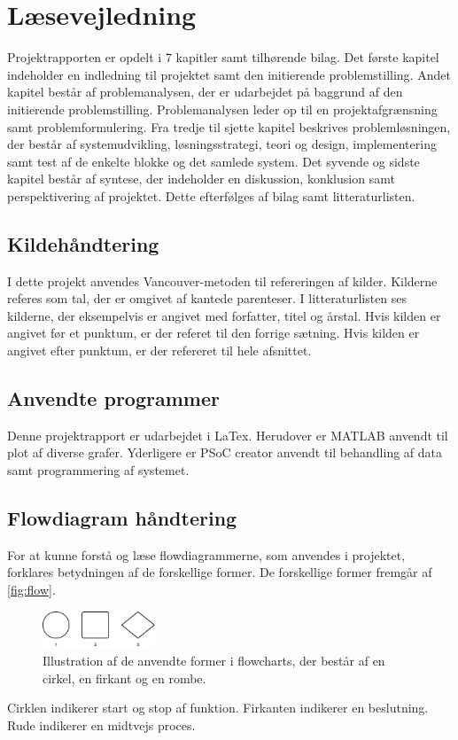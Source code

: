 \section*{Læsevejledning}
Projektrapporten er opdelt i 7 kapitler samt tilhørende bilag. Det første kapitel indeholder en indledning til projektet samt den initierende problemstilling. Andet kapitel består af problemanalysen, der er udarbejdet på baggrund af den initierende problemstilling. Problemanalysen leder op til en projektafgrænsning samt problemformulering. Fra tredje til sjette kapitel beskrives problemløsningen, der består af systemudvikling, løsningsstrategi, teori og design, implementering samt test af de enkelte blokke og det samlede system. Det syvende og sidste kapitel består af syntese, der indeholder en diskussion, konklusion samt perspektivering af projektet. Dette efterfølges af bilag samt litteraturlisten. 


\subsection*{Kildehåndtering}
I dette projekt anvendes Vancouver-metoden til refereringen af kilder. Kilderne referes som tal, der er omgivet af kantede parenteser. I litteraturlisten ses kilderne, der eksempelvis er angivet med forfatter, titel og årstal. Hvis kilden er angivet før et punktum, er der referet til den forrige sætning. Hvis kilden er angivet efter punktum, er der refereret til hele afsnittet.

\subsection*{Anvendte programmer} 
Denne projektrapport er udarbejdet i LaTex. Herudover er MATLAB anvendt til plot af diverse grafer. Yderligere er PSoC creator anvendt til behandling af data samt programmering af systemet.  


\subsection*{Flowdiagram håndtering} \label{sec:flowhaandtering}
For at kunne forstå og læse flowdiagrammerne, som anvendes i projektet, forklares betydningen af de forskellige former. De forskellige former fremgår af \autoref{fig:flow}.

\begin{figure}[H]
\centering
\includegraphics[width=0.3\textwidth]{figures/flow}
\caption{Illustration af de anvendte former i flowcharts, der består af en cirkel, en firkant og en rombe.}
\label{fig:flow}
\end{figure}

\noindent
Cirklen indikerer start og stop af funktion. Firkanten indikerer en beslutning. Rude indikerer en midtvejs proces.